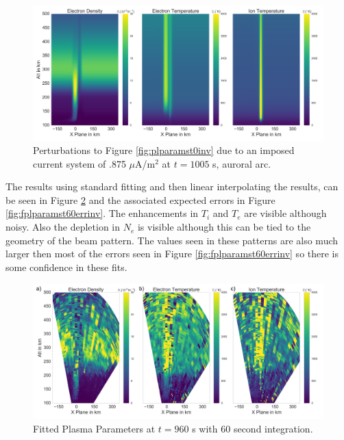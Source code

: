 \begin{figure}[!ht]
\centering
\includegraphics[width=6in]{1005_15_int}
\caption{Perturbations to Figure \ref{fig:plparamst0inv} due to an imposed current system of .875 $\mu$A/m$^2$ at $t=1005$ s, auroral arc.}
\label{fig:plparamst1005inv}
\end{figure}

The results using standard fitting and then linear interpolating the results, can be seen in Figure \ref{fig:fplparamst60inv} and the associated expected errors in Figure \ref{fig:fplparamst60errinv}. The enhancements in $T_i$ and $T_e$ are visible although noisy. Also the depletion in $N_e$ is visible although this can be tied to the geometry of the beam pattern. The values seen in these patterns are also much larger then most of the errors seen in Figure \ref{fig:fplparamst60errinv} so there is some confidence in these fits.

\begin{figure}[!ht]
\centering
\includegraphics[width=6in]{0960_60_int}
\caption{Fitted Plasma Parameters at $t=960$ s with 60 second integration.}
\label{fig:fplparamst60inv}
\end{figure}

